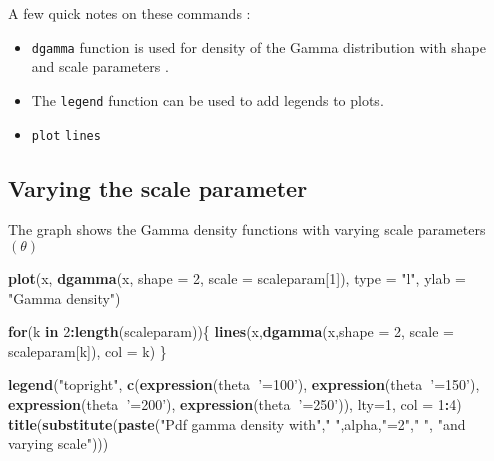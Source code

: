 \documentclass[]{book}
\newenvironment{Shaded}{\begin{snugshade}}{\end{snugshade}}
\newcommand{\KeywordTok}[1]{\textcolor[rgb]{0.13,0.29,0.53}{\textbf{#1}}}
\newcommand{\DataTypeTok}[1]{\textcolor[rgb]{0.13,0.29,0.53}{#1}}
\newcommand{\DecValTok}[1]{\textcolor[rgb]{0.00,0.00,0.81}{#1}}
\newcommand{\StringTok}[1]{\textcolor[rgb]{0.31,0.60,0.02}{#1}}
\newcommand{\ControlFlowTok}[1]{\textcolor[rgb]{0.13,0.29,0.53}{\textbf{#1}}}
\newcommand{\OperatorTok}[1]{\textcolor[rgb]{0.81,0.36,0.00}{\textbf{#1}}}
\newcommand{\NormalTok}[1]{#1}
\theoremstyle{definition}
\theoremstyle{definition}
\theoremstyle{definition}
\theoremstyle{remark}
\begin{document}
A few quick notes on these commands :

\begin{itemize}
\item
  \texttt{dgamma} function is used for density of the Gamma distribution
  with shape and scale parameters .
\item
  The \texttt{legend} function can be used to add legends to plots.
\item
  \texttt{plot} \texttt{lines}
\end{itemize}

\subsection{Varying the scale
parameter}\label{varying-the-scale-parameter}

The graph shows the Gamma density functions with varying scale
parameters \((\theta)\)

\begin{Shaded}
\begin{Highlighting}[]
\KeywordTok{plot}\NormalTok{(x, }\KeywordTok{dgamma}\NormalTok{(x, }\DataTypeTok{shape =} \DecValTok{2}\NormalTok{, }\DataTypeTok{scale =}\NormalTok{ scaleparam[}\DecValTok{1}\NormalTok{]), }\DataTypeTok{type =} \StringTok{"l"}\NormalTok{, }\DataTypeTok{ylab =} \StringTok{"Gamma density"}\NormalTok{)}

\ControlFlowTok{for}\NormalTok{(k }\ControlFlowTok{in} \DecValTok{2}\OperatorTok{:}\KeywordTok{length}\NormalTok{(scaleparam))\{}
  \KeywordTok{lines}\NormalTok{(x,}\KeywordTok{dgamma}\NormalTok{(x,}\DataTypeTok{shape =} \DecValTok{2}\NormalTok{, }\DataTypeTok{scale =}\NormalTok{ scaleparam[k]), }\DataTypeTok{col =}\NormalTok{ k)}
\NormalTok{\}}

\KeywordTok{legend}\NormalTok{(}\StringTok{"topright"}\NormalTok{, }\KeywordTok{c}\NormalTok{(}\KeywordTok{expression}\NormalTok{(theta}\OperatorTok{~}\StringTok{'=100'}\NormalTok{), }\KeywordTok{expression}\NormalTok{(theta}\OperatorTok{~}\StringTok{'=150'}\NormalTok{), }\KeywordTok{expression}\NormalTok{(theta}\OperatorTok{~}\StringTok{'=200'}\NormalTok{), }\KeywordTok{expression}\NormalTok{(theta}\OperatorTok{~}\StringTok{'=250'}\NormalTok{)), }\DataTypeTok{lty=}\DecValTok{1}\NormalTok{, }\DataTypeTok{col =} \DecValTok{1}\OperatorTok{:}\DecValTok{4}\NormalTok{)}
\KeywordTok{title}\NormalTok{(}\KeywordTok{substitute}\NormalTok{(}\KeywordTok{paste}\NormalTok{(}\StringTok{"Pdf gamma density with"}\NormalTok{,}\StringTok{" "}\NormalTok{,alpha,}\StringTok{"=2"}\NormalTok{,}\StringTok{" "}\NormalTok{, }\StringTok{"and varying scale"}\NormalTok{)))}
\end{Highlighting}
\end{Shaded}
\end{document}
